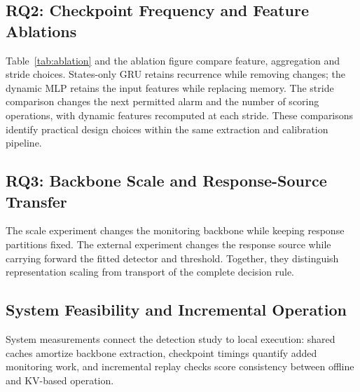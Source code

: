 \subsection{RQ2: Checkpoint Frequency and Feature Ablations}
Table~\ref{tab:ablation} and the ablation figure compare feature, aggregation and stride choices. States-only GRU retains recurrence while removing changes; the dynamic MLP retains the input features while replacing memory. The stride comparison changes the next permitted alarm and the number of scoring operations, with dynamic features recomputed at each stride. These comparisons identify practical design choices within the same extraction and calibration pipeline.
\StrideResultsEN{}


\subsection{RQ3: Backbone Scale and Response-Source Transfer}
The scale experiment changes the monitoring backbone while keeping response partitions fixed. The external experiment changes the response source while carrying forward the fitted detector and threshold. Together, they distinguish representation scaling from transport of the complete decision rule.
\AchievementScaleEN{}


\subsection{System Feasibility and Incremental Operation}
System measurements connect the detection study to local execution: shared caches amortize backbone extraction, checkpoint timings quantify added monitoring work, and incremental replay checks score consistency between offline and KV-based operation.



